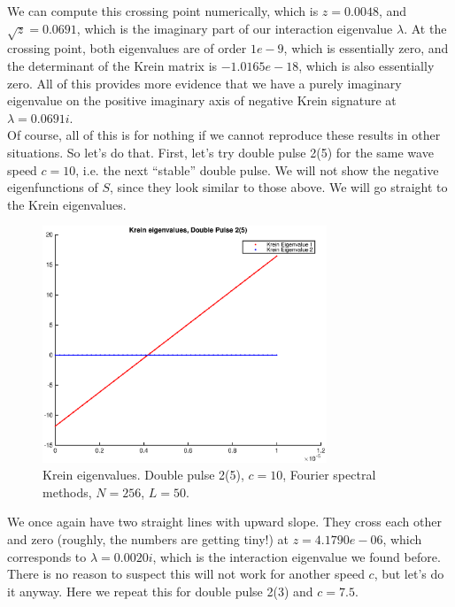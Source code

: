 \documentclass[12pt]{article}
\begin{document}
We can compute this crossing point numerically, which is $z = 0.0048$, and $\sqrt{z} = 0.0691$, which is the imaginary part of our interaction eigenvalue $\lambda$. At the crossing point, both eigenvalues are of order $1e-9$, which is essentially zero, and the determinant of the Krein matrix is $-1.0165e-18$, which is also essentially zero. All of this provides more evidence that we have a purely imaginary eigenvalue on the positive imaginary axis of negative Krein signature at $\lambda = 0.0691i$.\\

Of course, all of this is for nothing if we cannot reproduce these results in other situations. So let's do that. First, let's try double pulse 2(5) for the same wave speed $c = 10$, i.e. the next ``stable'' double pulse. We will not show the negative eigenfunctions of $S$, since they look similar to those above. We will go straight to the Krein eigenvalues.

\begin{figure}[H]
	\includegraphics[width=8.5cm]{dp4kreineig1}
	\caption{Krein eigenvalues. Double pulse 2(5), $c = 10$, Fourier spectral methods, $N = 256$, $L = 50$. }
\end{figure}

We once again have two straight lines with upward slope. They cross each other and zero (roughly, the numbers are getting tiny!) at $z = 4.1790e-06$, which corresponds to $\lambda = 0.0020i$, which is the interaction eigenvalue we found before.\\

There is no reason to suspect this will not work for another speed $c$, but let's do it anyway. Here we repeat this for double pulse 2(3) and $c = 7.5$.
\end{document}
